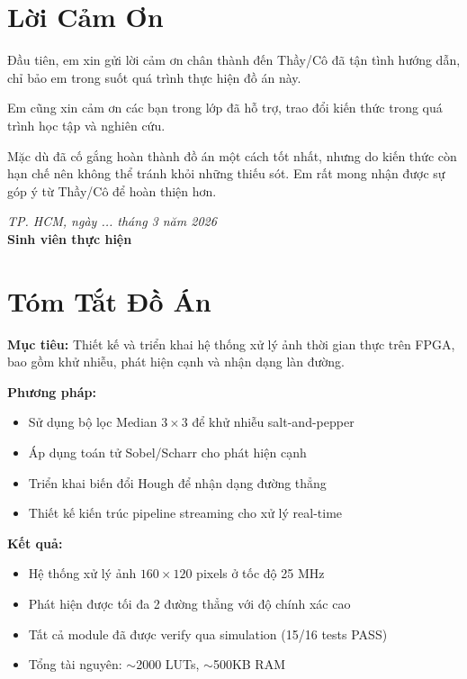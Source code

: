 \documentclass[12pt,a4paper]{report}
\begin{document}
\chapter*{Lời Cảm Ơn}

Đầu tiên, em xin gửi lời cảm ơn chân thành đến Thầy/Cô đã tận tình hướng dẫn, chỉ bảo em trong suốt quá trình thực hiện đồ án này.

Em cũng xin cảm ơn các bạn trong lớp đã hỗ trợ, trao đổi kiến thức trong quá trình học tập và nghiên cứu.

Mặc dù đã cố gắng hoàn thành đồ án một cách tốt nhất, nhưng do kiến thức còn hạn chế nên không thể tránh khỏi những thiếu sót. Em rất mong nhận được sự góp ý từ Thầy/Cô để hoàn thiện hơn.

\vspace{2cm}
\begin{flushright}
    \textit{TP. HCM, ngày ... tháng 3 năm 2026}\\[0.5cm]
    \textbf{Sinh viên thực hiện}
\end{flushright}

\chapter*{Tóm Tắt Đồ Án}

\textbf{Mục tiêu:} Thiết kế và triển khai hệ thống xử lý ảnh thời gian thực trên FPGA, bao gồm khử nhiễu, phát hiện cạnh và nhận dạng làn đường.

\textbf{Phương pháp:}
\begin{itemize}
    \item Sử dụng bộ lọc Median $3\times3$ để khử nhiễu salt-and-pepper
    \item Áp dụng toán tử Sobel/Scharr cho phát hiện cạnh
    \item Triển khai biến đổi Hough để nhận dạng đường thẳng
    \item Thiết kế kiến trúc pipeline streaming cho xử lý real-time
\end{itemize}

\textbf{Kết quả:}
\begin{itemize}
    \item Hệ thống xử lý ảnh $160\times120$ pixels ở tốc độ 25 MHz
    \item Phát hiện được tối đa 2 đường thẳng với độ chính xác cao
    \item Tất cả module đã được verify qua simulation (15/16 tests PASS)
    \item Tổng tài nguyên: $\sim$2000 LUTs, $\sim$500KB RAM
\end{itemize}
\end{document}
